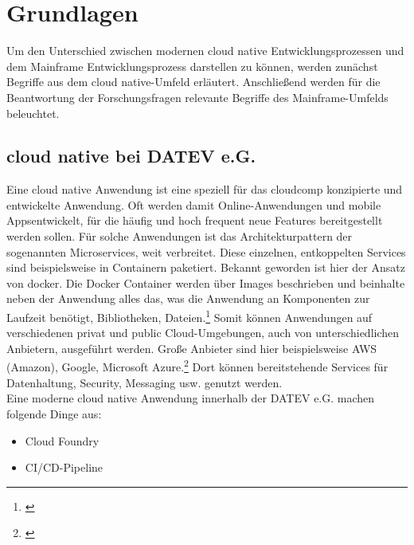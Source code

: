 \chapter{Grundlagen}\label{ch:grundlagen}
Um den Unterschied zwischen modernen cloud native Entwicklungsprozessen und dem Mainframe Entwicklungsprozess darstellen zu können, werden zunächst Begriffe aus dem cloud native-Umfeld erläutert.
Anschließend werden für die Beantwortung der Forschungsfragen relevante Begriffe des Mainframe-Umfelds beleuchtet.

\section{cloud native bei DATEV e.G.}\label{sec:cloudnative}
Eine cloud native Anwendung ist eine speziell für das \Gls{cloudcomp} konzipierte und entwickelte Anwendung.
Oft werden damit Online-Anwendungen und mobile \glqq Apps\grqq entwickelt, für die häufig und hoch frequent neue Features bereitgestellt werden sollen. 
Für solche Anwendungen ist das Architekturpattern der sogenannten \glqq Microservices\grqq, weit verbreitet.
Diese einzelnen, entkoppelten Services sind beispielsweise in Containern paketiert. 
Bekannt geworden ist hier der Ansatz von \Gls{docker}.
Die Docker Container werden über Images beschrieben und beinhalte neben der Anwendung alles das, was die Anwendung an Komponenten zur Laufzeit benötigt, Bibliotheken, Dateien.\footnote{\cite[Kap. 1]{Vohra.2016}}
Somit können Anwendungen auf verschiedenen \glqq privat\grqq{} und \glqq public\grqq{} Cloud-Umgebungen, auch von unterschiedlichen Anbietern, ausgeführt werden.
Große Anbieter sind hier beispielsweise AWS (Amazon), Google, Microsoft Azure.\footnote{\cite{.27.2.2020}}
Dort können bereitstehende Services für Datenhaltung, Security, Messaging usw. genutzt werden. 
\cite{.23.2.2020d}\\
Eine moderne cloud native Anwendung innerhalb der DATEV e.G. machen folgende Dinge aus:
\begin{itemize}
\item \glqq Cloud Foundry\grqq
\item CI/CD-Pipeline
\end{itemize}

